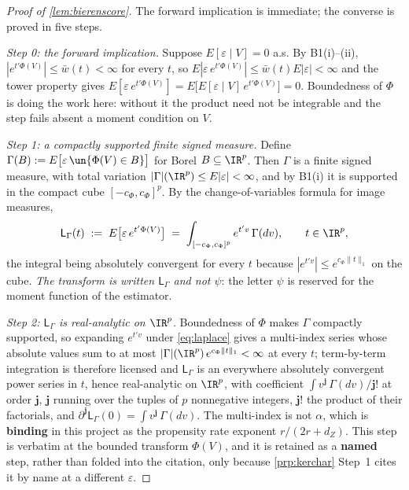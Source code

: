 
\begin{proof}[Proof of \cref{lem:bierenscore}]
The forward implication is immediate; the converse is proved in five steps.

\emph{Step 0: the forward implication.}
Suppose $E[\varepsilon\mid V]=0$ a.s. By B1(i)--(ii), $|e^{t'\Phi(V)}|\le\bar w(t)<\infty$ for every $t$,
so $E|\varepsilon\,e^{t'\Phi(V)}|\le\bar w(t)E|\varepsilon|<\infty$ and the tower property gives
$E[\varepsilon\,e^{t'\Phi(V)}]=E\big[E[\varepsilon\mid V]\,e^{t'\Phi(V)}\big]=0$. Boundedness of
$\Phi$ is doing the work here: without it the product need not be integrable and the step fails absent a
moment condition on $V$.

\emph{Step 1: a compactly supported finite signed measure.}
Define $\Gamma(B):=E\big[\varepsilon\,\un\{\Phi(V)\in B\}\big]$ for Borel $B\subseteq\IR^{p}$. Then
$\Gamma$ is a finite signed measure, with total variation $|\Gamma|(\IR^{p})\le E|\varepsilon|<\infty$,
and by B1(i) it is supported in the compact cube $[-c_\Phi,c_\Phi]^{p}$. By the change-of-variables
formula for image measures,
\begin{equation}\label{eq:laplace}
\mathsf L_\Gamma(t)\;:=\;E\big[\varepsilon\,e^{t'\Phi(V)}\big]\;=\;\int_{[-c_\Phi,c_\Phi]^{p}}e^{t'v}\,\Gamma(dv),
\qquad t\in\IR^{p},
\end{equation}
the integral being absolutely convergent for every $t$ because $|e^{t'v}|\le e^{c_\Phi\|t\|_1}$ on the
cube. \emph{The transform is written $\mathsf L_\Gamma$ and not $\psi$}: the letter $\psi$ is reserved
for the moment function of the estimator.

\emph{Step 2: $\mathsf L_\Gamma$ is real-analytic on $\IR^{p}$.} Boundedness of $\Phi$ makes $\Gamma$
compactly supported, so expanding $e^{t'v}$ under \eqref{eq:laplace} gives a multi-index series whose
absolute values sum to at most $|\Gamma|(\IR^{p})\,e^{c_\Phi\|t\|_{1}}<\infty$ at every $t$; term-by-term
integration is therefore licensed and $\mathsf L_\Gamma$ is an everywhere absolutely convergent power
series in $t$, hence real-analytic on $\IR^{p}$, with coefficient
$\int v^{\mathbf j}\,\Gamma(dv)/\mathbf j!$ at order $\mathbf j$, $\mathbf j$ running over the tuples
of $p$ nonnegative integers, $\mathbf j!$ the product of their factorials, and
$\partial^{\mathbf j}\mathsf L_\Gamma(0)=\int v^{\mathbf j}\,\Gamma(dv)$. The multi-index is not
$\alpha$, which is \textbf{binding} in this project as the propensity rate exponent
$r/(2r+d_Z)$. This step is \citet[proof of Thm.~1]{bierens1990} verbatim at the
bounded transform $\Phi(V)$, and it is retained as a \textbf{named} step, rather than folded into the
citation, only because \cref{prp:kerchar} Step~1 cites it by name at a different $\varepsilon$.


\end{proof}
